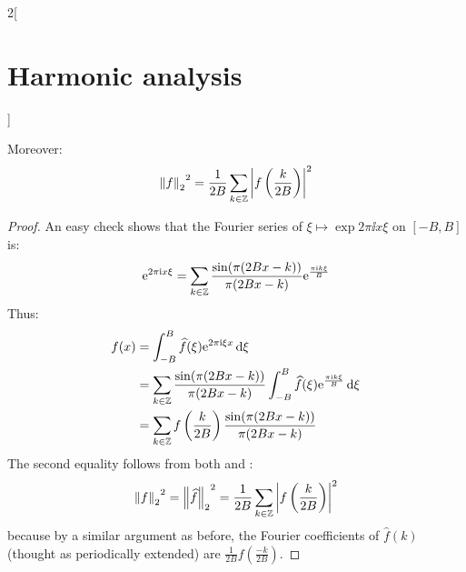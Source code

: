 \documentclass[../../../main_math.tex]{subfiles}
\begin{document}
\begin{multicols}{2}[\section{Harmonic analysis}]
\begin{theorem}
    Moreover: $${\left\|f\right\|_2}^2=\frac{1}{2B}\sum_{k\in\mathbb{Z}}\abs{f\left(\frac{k}{2B}\right)}^2$$
  \end{theorem}
  \begin{proof}
    An easy check shows that the Fourier series of $\xi\mapsto\exp{2\pi\ii x\xi}$ on $[-B, B]$ is: $$\mathrm{e}^{2\pi\mathrm{i} x\xi}=\sum_{k\in\mathbb{Z}}\frac{\sin(\pi(2Bx-k))}{\pi(2Bx-k)}\mathrm{e}^{\frac{\pi\mathrm{i} k\xi}{B}}$$
    Thus:
    \begin{align*}
      f(x) & =\int_{-B}^{B}\widehat{f}(\xi)\mathrm{e}^{2\pi\mathrm{i} \xi x}\dd{\xi}                                                           \\
           & =\sum_{k\in\mathbb{Z}}\frac{\sin(\pi(2Bx-k))}{\pi(2Bx-k)}\int_{-B}^{B}\widehat{f}(\xi)\mathrm{e}^{\frac{\pi\mathrm{i} k\xi}{B}} \dd{\xi} \\
           & =\sum_{k\in\mathbb{Z}}f\left(\frac{k}{2B}\right)\frac{\sin(\pi(2Bx-k))}{\pi(2Bx-k)}
    \end{align*}
    The second equality follows from both  and :
    $${\left\|f\right\|_2}^2={\left\|\widehat{f}\right\|_2}^2=\frac{1}{2B}\sum_{k\in\mathbb{Z}}\abs{f\left(\frac{k}{2B}\right)}^2$$
    because by a similar argument as before, the Fourier coefficients of $\widehat{f}(k)$ (thought as periodically extended) are $\frac{1}{2B}f\left(\frac{-k}{2B}\right)$.
  \end{proof}

\end{multicols}
\end{document}
